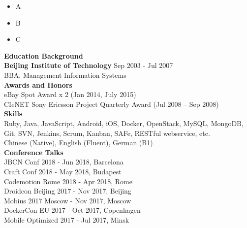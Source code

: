 \documentclass[12pt, a4paper]{article}
\begin{document}
\begin{itemize}
  \setlength\itemsep{0em}
  \item A
  \item B
  \item C
\end{itemize}

\textcolor{highlightblue}{\textbf{\huge Education Background}} \\

\textbf{Beijing Institute of Technology} \hfill Sep 2003 - Jul 2007 \\

BBA, Management Information Systems \\

\textcolor{highlightblue}{\textbf{\huge Awards and Honors}} \\

eBay Spot Award x 2 (Jan 2014, July 2015) \\

CIeNET Sony Ericsson Project Quarterly Award (Jul 2008 – Sep 2008) \\

\textcolor{highlightblue}{\textbf{\huge Skills}} \\

Ruby, Java, JavaScript, Android, iOS, Docker, OpenStack, MySQL, MongoDB, Git, SVN, Jenkins, Scrum, Kanban, SAFe, RESTful webservice, etc. \\

Chinese (Native), English (Fluent), German (B1) \\

\textcolor{highlightblue}{\textbf{\huge Conference Talks}} \\

JBCN Conf 2018 - Jun 2018, Barcelona \\

Craft Conf 2018 - May 2018, Budapest \\

Codemotion Rome 2018 - Apr 2018, Rome \\

Droidcon Beijing 2017 - Nov 2017, Beijing \\

Mobius 2017 Moscow - Nov 2017, Moscow \\

DockerCon EU 2017 - Oct 2017, Copenhagen \\

Mobile Optimized 2017 - Jul 2017, Minsk \\
\end{document}
